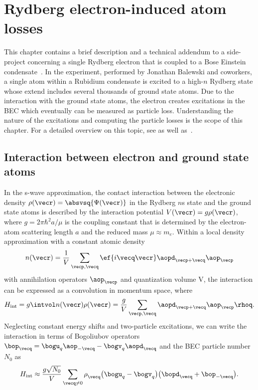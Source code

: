 \chapter{Rydberg electron-induced atom losses}
\label{rydberg_losses}

This chapter contains a brief description and a technical addendum to a side-project concerning a single Rydberg electron that is coupled to a Bose Einstein condensate~\cite{Balewski2013}.
In the experiment, performed by Jonathan Balewski and coworkers, a single atom within a Rubidium condensate is excited to a \mbox{high-$n$} Rydberg state whose extend includes several thousands of ground state atoms.
Due to the interaction with the ground state atoms, the electron creates excitations in the BEC which eventually can be measured as particle loss.
Understanding the nature of the excitations and computing the particle losses is the scope of this chapter.
For a detailed overview on this topic, see  as well as~.

\section{Interaction between electron and ground state atoms}
In the s-wave approximation, the contact interaction between the electronic density $\rho(\vecr)=\absvsq{\Psi(\vecr)}$ in the Rydberg $n$s state and the ground state atoms is described by the interaction potential $V(\vecr)=g \rho(\vecr)$, where $g=2\pi \hbar^2 a/\mu$ is the coupling constant that is determined by the electron-atom scattering length $a$ and the reduced mass $\mu \approx m_e$. Within a local density approximation with a constant atomic density
\begin{align}
    n(\vecr)=\frac{1}{V} \sum_{\vecp,\vecq} \ef{i\vecq\vecr}\aopd_{\vecp+\vecq} \aop_{\vecp}
\end{align}
with annihilation operators $\aop_{\vecp}$ and quantization volume V, the interaction can be expressed as a convolution in momentum space, where
\begin{align}
H_\text{int} = g\intvol n(\vecr)\rho(\vecr) = \frac{g}{V} \sum_{\vecp,\vecq} \aopd_{\vecp+\vecq} \aop_{\vecp} \rhoq.
\end{align}
Neglecting constant energy shifts and two-particle excitations, we can write the interaction in terms of Bogoliubov operators $\bop_{\vecq}=\bogu_q \aop_{-\vecq} - \bogv_q \aopd_{\vecq}$ and the BEC particle number $N_0$ as
\begin{align}
H_\text{int}\approx\frac{g\sqrt{N_0}}{V} \sum_{\vecq\ne 0} \rho^{\phantom\dagger}_{\vecq} \big(\bogu_{q}-\bogv_{q}\big) \big(\bopd_{\vecq}+\bop_{-\vecq}\big).
\end{align}
